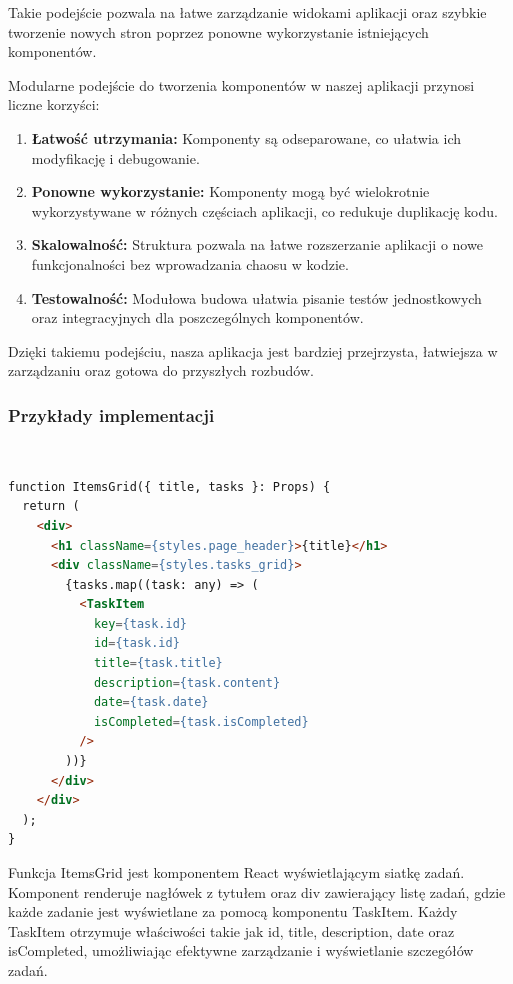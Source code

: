 \noindent Takie podejście pozwala na łatwe zarządzanie widokami aplikacji oraz szybkie tworzenie nowych stron poprzez ponowne wykorzystanie istniejących komponentów.
\\


\noindent Modularne podejście do tworzenia komponentów w naszej aplikacji przynosi liczne korzyści:
\begin{enumerate}
    \item {\bf Łatwość utrzymania:} Komponenty są odseparowane, co ułatwia ich modyfikację i debugowanie.
    \item {\bf Ponowne wykorzystanie:} Komponenty mogą być wielokrotnie wykorzystywane w różnych częściach aplikacji, co redukuje duplikację kodu.
    \item {\bf Skalowalność:} Struktura pozwala na łatwe rozszerzanie aplikacji o nowe funkcjonalności bez wprowadzania chaosu w kodzie.
    \item {\bf Testowalność:} Modułowa budowa ułatwia pisanie testów jednostkowych oraz integracyjnych dla poszczególnych komponentów.
\end{enumerate}

\noindent Dzięki takiemu podejściu, nasza aplikacja jest bardziej przejrzysta, łatwiejsza w zarządzaniu oraz gotowa do przyszłych rozbudów.

\subsubsection{Przykłady implementacji}

\\

\begin{lstlisting}[language=html, caption=ItemsGrid example]
function ItemsGrid({ title, tasks }: Props) {
  return (
    <div>
      <h1 className={styles.page_header}>{title}</h1>
      <div className={styles.tasks_grid}>
        {tasks.map((task: any) => (
          <TaskItem
            key={task.id}
            id={task.id}
            title={task.title}
            description={task.content}
            date={task.date}
            isCompleted={task.isCompleted}
          />
        ))}
      </div>
    </div>
  );
}
\end{lstlisting}
Funkcja ItemsGrid jest komponentem React wyświetlającym siatkę zadań. Komponent renderuje nagłówek z tytułem oraz div zawierający listę zadań, gdzie każde zadanie jest wyświetlane za pomocą komponentu TaskItem. Każdy TaskItem otrzymuje właściwości takie jak id, title, description, date oraz isCompleted, umożliwiając efektywne zarządzanie i wyświetlanie szczegółów zadań.
\\

